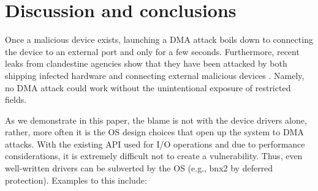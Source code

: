 

\section{Discussion and conclusions}

Once a malicious device exists, launching a DMA attack boils down to connecting the device to an external port and only for a few seconds. Furthermore, recent leaks from clandestine agencies show that they have been attacked by both shipping infected hardware \cite{Gal14} and connecting external malicious devices \cite{Fin14}. Namely, no DMA attack could work without the unintentional exposure of restricted fields.

\begin{comment}
\footnote{\url{https://lore.kernel.org/lkml/20180510230948.GF190385@bhelgaas-glaptop.roam.corp.google.com/}}.
\end{comment}

As we demonstrate in this paper, the blame is not with the device drivers alone, rather, more often it is the OS design choices that open up the system to DMA attacks. With the existing API used for I/O operations and due to performance considerations, it is extremely difficult not to create a \subpage{} vulnerability. Thus, even well-written drivers can be subverted by the OS (e.g., bnx2 by deferred protection). Examples to this include:

